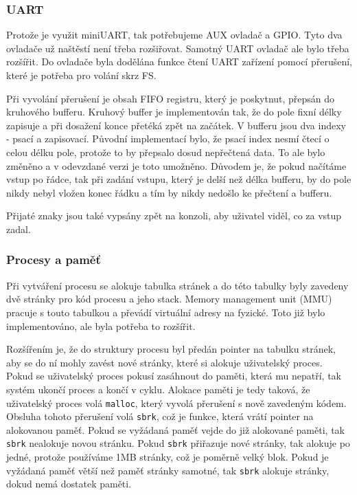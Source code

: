 \documentclass[12pt, letterpaper]{article}
\begin{document}
\subsubsection{UART}
Protože je využit miniUART, tak potřebujeme AUX ovladač a GPIO. Tyto dva ovladače už naštěstí není třeba rozšiřovat.
Samotný UART ovladač ale bylo třeba rozšířit. Do ovladače byla dodělána funkce čtení UART zařízení pomocí přerušení,
které je potřeba pro volání skrz FS.

Při vyvolání přerušení je obsah FIFO registru, který je poskytnut, přepsán do kruhového bufferu. Kruhový buffer je
implementován tak, že do pole fixní délky zapisuje a při dosažení konce přetéká zpět na začátek. V bufferu jsou 
dva indexy - psací a zapisovací. Původní implementací bylo, že psací index nesmí  čtecí o celou délku 
pole, protože to by přepsalo dosud nepřečtená data. To ale bylo změněno a v odevzdané verzi je toto umožněno. Důvodem
je, že pokud načítáme vstup po řádce, tak při zadání vstupu, který je delší než délka bufferu, by do pole nikdy
nebyl vložen konec řádku a tím by nikdy nedošlo ke přečtení a  bufferu.

Přijaté znaky jsou také vypsány zpět na konzoli, aby uživatel viděl, co za vstup zadal.
%
\subsubsection{Procesy a paměť}
Při vytváření procesu se alokuje tabulka stránek a do této tabulky byly zavedeny dvě stránky pro 
kód procesu a jeho stack. Memory management unit (MMU) pracuje s touto tabulkou a převádí virtuální adresy na 
fyzické. Toto již bylo implementováno, ale byla potřeba to rozšířit.

Rozšířením je, že do struktury procesu byl předán pointer na tabulku stránek, aby se do ní mohly zavést nové stránky,
které si alokuje uživatelský proces. Pokud se uživatelský proces pokusí zasáhnout do paměti, která mu nepatří, tak
systém ukončí proces a končí v cyklu. Alokace paměti je tedy taková, že uživatelský proces volá \texttt{malloc}, který
vyvolá přerušení s nově zavedeným kódem. Obsluha tohoto přerušení volá \texttt{sbrk}, což je funkce, která vrátí 
pointer na alokovanou paměť. Pokud se vyžádaná paměť vejde do již alokované paměti, tak \texttt{sbrk} nealokuje novou
stránku. Pokud \texttt{sbrk} přiřazuje nové stránky, tak alokuje po jedné, protože používáme 1MB stránky, což je
poměrně velký blok. Pokud je vyžádaná paměť větší než paměť stránky samotné, tak \texttt{sbrk} alokuje
stránky, dokud nemá dostatek paměti.
\end{document}
